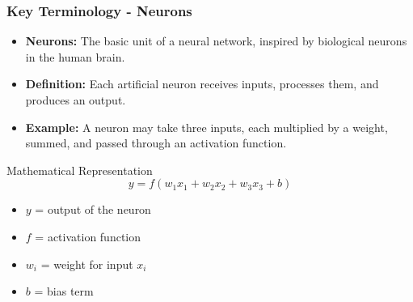 \documentclass[aspectratio=169]{beamer}
\begin{document}
\begin{frame}[fragile]
    \frametitle{Key Terminology - Neurons}
    \begin{itemize}
        \item \textbf{Neurons:} The basic unit of a neural network, inspired by biological neurons in the human brain. 
        \item \textbf{Definition:} Each artificial neuron receives inputs, processes them, and produces an output.
        \item \textbf{Example:} A neuron may take three inputs, each multiplied by a weight, summed, and passed through an activation function.
    \end{itemize}
    \begin{block}{Mathematical Representation}
        \[
        y = f(w_1 x_1 + w_2 x_2 + w_3 x_3 + b)
        \]
        \begin{itemize}
            \item \(y\) = output of the neuron
            \item \(f\) = activation function
            \item \(w_i\) = weight for input \(x_i\)
            \item \(b\) = bias term
        \end{itemize}
    \end{block}
\end{frame}
\end{document}
